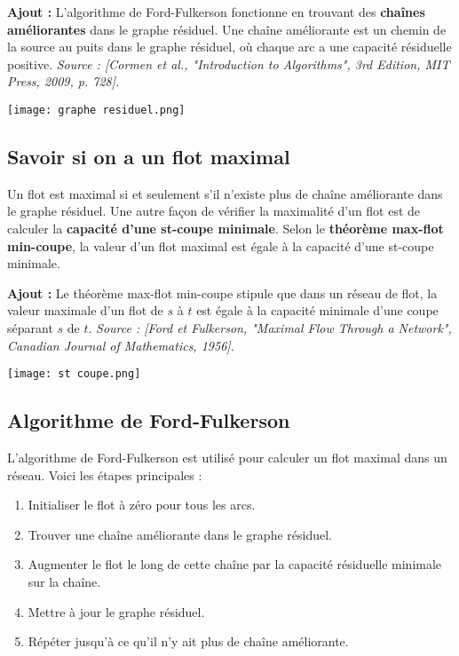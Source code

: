 \documentclass[10pt,a4paper]{article}
\begin{document}
\textbf{Ajout :} L'algorithme de Ford-Fulkerson fonctionne en trouvant des \textbf{chaînes améliorantes} dans le graphe résiduel. Une chaîne améliorante est un chemin de la source au puits dans le graphe résiduel, où chaque arc a une capacité résiduelle positive. \textit{Source : [Cormen et al., "Introduction to Algorithms", 3rd Edition, MIT Press, 2009, p. 728].}

\texttt{[image: graphe residuel.png]}

\subsection*{Savoir si on a un flot maximal}

Un flot est maximal si et seulement s'il n'existe plus de chaîne améliorante dans le graphe résiduel. Une autre façon de vérifier la maximalité d'un flot est de calculer la \textbf{capacité d'une st-coupe minimale}. Selon le \textbf{théorème max-flot min-coupe}, la valeur d'un flot maximal est égale à la capacité d'une st-coupe minimale.

\textbf{Ajout :} Le théorème max-flot min-coupe stipule que dans un réseau de flot, la valeur maximale d'un flot de \( s \) à \( t \) est égale à la capacité minimale d'une coupe séparant \( s \) de \( t \). \textit{Source : [Ford et Fulkerson, "Maximal Flow Through a Network", Canadian Journal of Mathematics, 1956].}

\texttt{[image: st coupe.png]}

\subsection*{Algorithme de Ford-Fulkerson}

L'algorithme de Ford-Fulkerson est utilisé pour calculer un flot maximal dans un réseau. Voici les étapes principales :
\begin{enumerate}
    \item Initialiser le flot à zéro pour tous les arcs.
    \item Trouver une chaîne améliorante dans le graphe résiduel.
    \item Augmenter le flot le long de cette chaîne par la capacité résiduelle minimale sur la chaîne.
    \item Mettre à jour le graphe résiduel.
    \item Répéter jusqu'à ce qu'il n'y ait plus de chaîne améliorante.
\end{enumerate}
\end{document}

